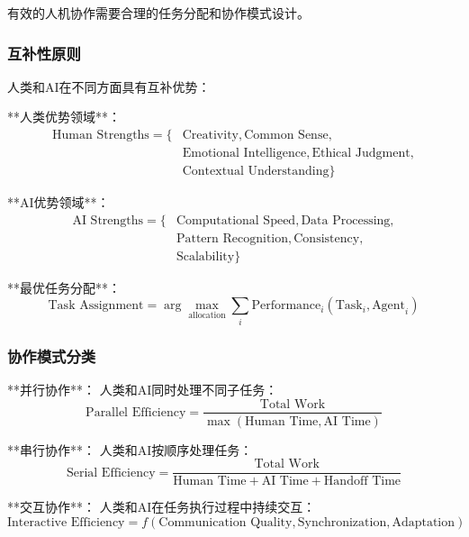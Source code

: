 有效的人机协作需要合理的任务分配和协作模式设计。

\subsubsection{互补性原则} %

人类和AI在不同方面具有互补优势：

**人类优势领域**：
\begin{align}
\text{Human Strengths} = \{&\text{Creativity}, \text{Common Sense}, \\
&\text{Emotional Intelligence}, \text{Ethical Judgment}, \\
&\text{Contextual Understanding}\}
\end{align}

**AI优势领域**：
\begin{align}
\text{AI Strengths} = \{&\text{Computational Speed}, \text{Data Processing}, \\
&\text{Pattern Recognition}, \text{Consistency}, \\
&\text{Scalability}\}
\end{align}

**最优任务分配**：
\begin{equation}
\text{Task Assignment} = \arg\max_{\text{allocation}} \sum_{i} \text{Performance}_i(\text{Task}_i, \text{Agent}_i)
\end{equation}

\subsubsection{协作模式分类} %

**并行协作**：
人类和AI同时处理不同子任务：
\begin{equation}
\text{Parallel Efficiency} = \frac{\text{Total Work}}{\max(\text{Human Time}, \text{AI Time})}
\end{equation}

**串行协作**：
人类和AI按顺序处理任务：
\begin{equation}
\text{Serial Efficiency} = \frac{\text{Total Work}}{\text{Human Time} + \text{AI Time} + \text{Handoff Time}}
\end{equation}

**交互协作**：
人类和AI在任务执行过程中持续交互：
\begin{equation}
\text{Interactive Efficiency} = f(\text{Communication Quality}, \text{Synchronization}, \text{Adaptation})
\end{equation}

